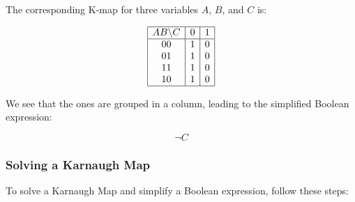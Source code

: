 The corresponding K-map for three variables \( A \), \( B \), and \( C \) is:

\[
	\begin{array}{|c|c|c|c|}
		\hline
		AB \backslash C & 0 & 1 \\
		\hline
		00              & 1 & 0 \\
		01              & 1 & 0 \\
		11              & 1 & 0 \\
		10              & 1 & 0 \\
		\hline
	\end{array}
\]

We see that the ones are grouped in a column, leading to the simplified Boolean expression:

\[
	\neg C
\]

\subsubsection{Solving a Karnaugh Map}

To solve a Karnaugh Map and simplify a Boolean expression, follow these steps:

